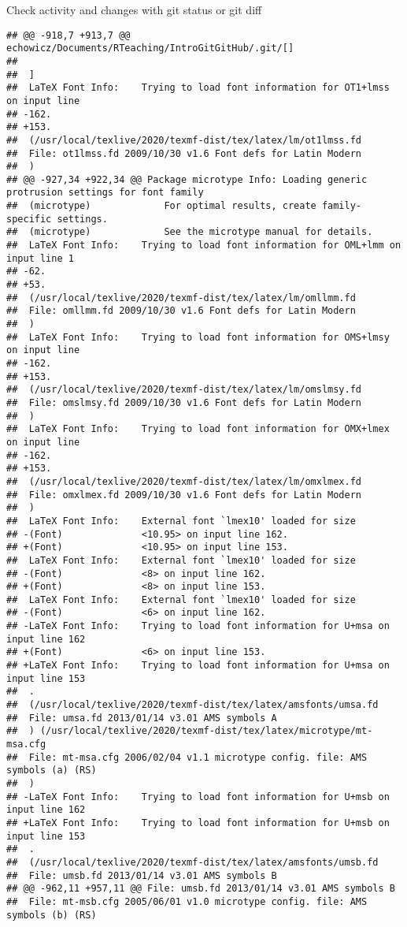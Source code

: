 \documentclass[ignorenonframetext,]{beamer}
\begin{document}
\begin{frame}[fragile]{Check activity and changes with git status or git
diff}
\begin{verbatim}
## @@ -918,7 +913,7 @@ echowicz/Documents/RTeaching/IntroGitGitHub/.git/[]
##  
##  ]
##  LaTeX Font Info:    Trying to load font information for OT1+lmss on input line 
## -162.
## +153.
##  (/usr/local/texlive/2020/texmf-dist/tex/latex/lm/ot1lmss.fd
##  File: ot1lmss.fd 2009/10/30 v1.6 Font defs for Latin Modern
##  )
## @@ -927,34 +922,34 @@ Package microtype Info: Loading generic protrusion settings for font family
##  (microtype)             For optimal results, create family-specific settings.
##  (microtype)             See the microtype manual for details.
##  LaTeX Font Info:    Trying to load font information for OML+lmm on input line 1
## -62.
## +53.
##  (/usr/local/texlive/2020/texmf-dist/tex/latex/lm/omllmm.fd
##  File: omllmm.fd 2009/10/30 v1.6 Font defs for Latin Modern
##  )
##  LaTeX Font Info:    Trying to load font information for OMS+lmsy on input line 
## -162.
## +153.
##  (/usr/local/texlive/2020/texmf-dist/tex/latex/lm/omslmsy.fd
##  File: omslmsy.fd 2009/10/30 v1.6 Font defs for Latin Modern
##  )
##  LaTeX Font Info:    Trying to load font information for OMX+lmex on input line 
## -162.
## +153.
##  (/usr/local/texlive/2020/texmf-dist/tex/latex/lm/omxlmex.fd
##  File: omxlmex.fd 2009/10/30 v1.6 Font defs for Latin Modern
##  )
##  LaTeX Font Info:    External font `lmex10' loaded for size
## -(Font)              <10.95> on input line 162.
## +(Font)              <10.95> on input line 153.
##  LaTeX Font Info:    External font `lmex10' loaded for size
## -(Font)              <8> on input line 162.
## +(Font)              <8> on input line 153.
##  LaTeX Font Info:    External font `lmex10' loaded for size
## -(Font)              <6> on input line 162.
## -LaTeX Font Info:    Trying to load font information for U+msa on input line 162
## +(Font)              <6> on input line 153.
## +LaTeX Font Info:    Trying to load font information for U+msa on input line 153
##  .
##  (/usr/local/texlive/2020/texmf-dist/tex/latex/amsfonts/umsa.fd
##  File: umsa.fd 2013/01/14 v3.01 AMS symbols A
##  ) (/usr/local/texlive/2020/texmf-dist/tex/latex/microtype/mt-msa.cfg
##  File: mt-msa.cfg 2006/02/04 v1.1 microtype config. file: AMS symbols (a) (RS)
##  )
## -LaTeX Font Info:    Trying to load font information for U+msb on input line 162
## +LaTeX Font Info:    Trying to load font information for U+msb on input line 153
##  .
##  (/usr/local/texlive/2020/texmf-dist/tex/latex/amsfonts/umsb.fd
##  File: umsb.fd 2013/01/14 v3.01 AMS symbols B
## @@ -962,11 +957,11 @@ File: umsb.fd 2013/01/14 v3.01 AMS symbols B
##  File: mt-msb.cfg 2005/06/01 v1.0 microtype config. file: AMS symbols (b) (RS)

\end{verbatim}
\end{frame}
\end{document}

